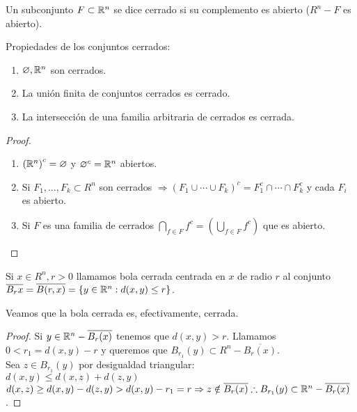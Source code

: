 \begin{definition}
  Un subconjunto \(F \subset \mathbb{R}^n\) se dice cerrado si su complemento es abierto (\(R^n - F\) es abierto).
\end{definition}


\begin{prop}
  Propiedades de los conjuntos cerrados:
  \begin{enumerate}
    \item \(\varnothing, \mathbb{R}^n\) son cerrados.
    \item La unión finita de conjuntos cerrados es cerrado.
    \item La intersección de una familia arbitraria de cerrados es cerrada.
  \end{enumerate}
  \begin{proof}
    \begin{enumerate}
      \item \({(\mathbb{R}^n)}^c = \varnothing \) y \(\varnothing^c = \mathbb{R}^n\) abiertos.
      \item Si \(F_1, \ldots, F_k \subset R^n\) son cerrados \(\Rightarrow {(F_1 \cup \cdots \cup F_k)}^c = F_1^c \cap \cdots \cap F_k^c\) y cada \(F_i\) es abierto.
      \item Si \(F\) es una familia de cerrados \(\bigcap_{f \in F} {f}^c = (\bigcup_{f \in F} f^c)\) que es abierto.
    \end{enumerate}
  \end{proof}
\end{prop}

\begin{definition}
  Si \(x \in R^n, r > 0\) llamamos bola cerrada centrada en \(x\) de radio \(r\) al conjunto \(\overline{B_r{x}} = \overline{B(r, x)} = \{ y \in \mathbb{R}^n : d(x, y) \leq r \} \).
\end{definition}

\begin{prop}
  Veamos que la bola cerrada es, efectivamente, cerrada.
  \begin{proof}
    Si \(y \in \mathbb{R}^n - \overline{B_r(x)} \) tenemos que \(d(x, y) > r\). Llamamos \(0 < r_1 = d(x, y) - r\) y queremos que \(B_{r_1}(y) \subset R^n - \overline{B_r(x)} \). \\
    Sea \(z \in B_{r_1}(y)\) por desigualdad triangular: \\
    \(d(x, y) \leq d(x, z) + d(z, y)\) \\
    \(d(x, z) \geq d(x, y) - d(z, y) > d(x, y) - r_1 = r \Rightarrow z \notin \overline{B_r(x)} \therefore B_{r_1}(y) \subset \mathbb{R}^n - \overline{B_r(x)} \).
  \end{proof}
\end{prop}

